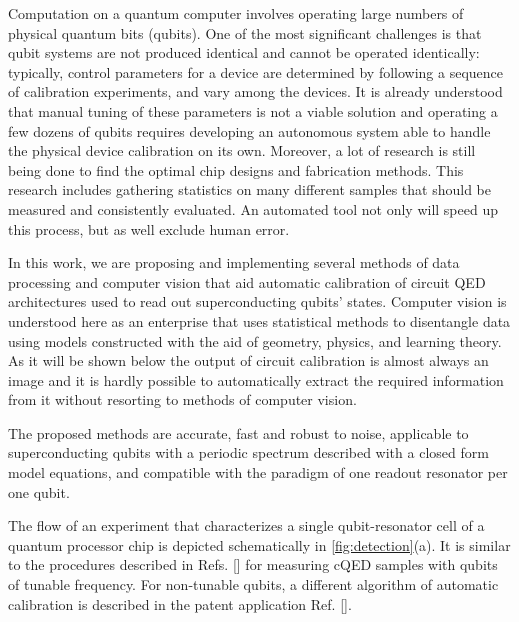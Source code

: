 \documentclass[%
 aip,
 draft,
 amsmath,amssymb,
 reprint,%
]{revtex4-1}
\begin{document}
Computation on a quantum computer involves operating large numbers of physical quantum bits (qubits). One of the most significant challenges is that qubit systems are not produced identical and cannot be operated identically\cite{kelly2018, chen2018}: typically, control parameters for a device are determined by following a sequence of calibration experiments, and vary among the devices. It is already understood that manual tuning of these parameters is not a viable solution and operating a few dozens of qubits requires developing an autonomous system able to handle the physical device calibration on its own. Moreover, a lot of research is still being done to find the optimal chip designs and fabrication methods. This research includes gathering statistics on many different samples that should be measured and consistently evaluated. An automated tool not only will speed up this process, but as well exclude human error.

In this work, we are proposing and implementing several methods of data processing and computer vision that aid automatic calibration of circuit QED\cite{blais2007} architectures used to read out superconducting qubits' states. Computer vision is understood here as an enterprise that uses statistical methods to disentangle data using models constructed with the aid of geometry, physics, and learning theory\cite{forsyth2011}. As it will be shown below the output of circuit calibration is almost always an image and it is hardly possible to automatically extract the required information from it without resorting to methods of computer vision.

The proposed methods are accurate, fast and robust to noise, applicable to superconducting qubits with a periodic spectrum described with a closed form model equations, and compatible with the paradigm of one readout resonator per one qubit\cite{versluis2017, kelly2015}.

The flow of an experiment that characterizes a single qubit-resonator cell of a quantum processor chip is depicted schematically in \autoref{fig:detection}(a). It is similar to the  procedures described in Refs. [] for measuring cQED samples with qubits of tunable frequency. For non-tunable qubits, a different algorithm of automatic calibration is described in the patent application Ref. [].
\end{document}
